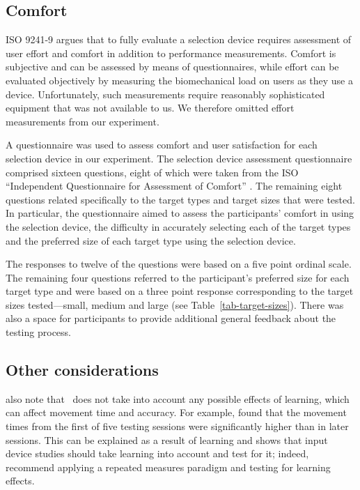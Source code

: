 \documentclass[a4paper]{article}
\begin{document}
\subsection{Comfort}
\label{sec-evaluation-comfort}

ISO 9241-9 argues that to fully evaluate a selection device requires
assessment of user effort and comfort in addition to performance
measurements. Comfort is subjective and can be assessed by means of
questionnaires, while effort can be evaluated objectively by measuring
the biomechanical load on users as they use a device. Unfortunately,
such measurements require reasonably sophisticated equipment
\citep{Doug-SA-1999-CHI} that was not available to us. We therefore
omitted effort measurements from our experiment.

A questionnaire was used to assess comfort and user satisfaction for
each selection device in our experiment. The selection device assessment
questionnaire comprised sixteen questions, eight of which were taken
from the ISO ``Independent Questionnaire for Assessment of Comfort''
\citep{Doug-SA-1999-CHI}. The remaining eight questions related
specifically to the target types and target sizes that were tested. In
particular, the questionnaire aimed to assess the participants' comfort
in using the selection device, the difficulty in accurately selecting each
of the target types and the preferred size of each target type using the
selection device.

The responses to twelve of the questions were based on a five point
ordinal scale. The remaining four questions referred to the
participant's preferred size for each target type and were based on a
three point response corresponding to the target sizes tested---small,
medium and large (see Table~\ref{tab-target-sizes}). There was also a
space for participants to provide additional general feedback about the
testing process.


\subsection{Other considerations}
\label{sec-evaluation-other}

\citet{Doug-SA-1999-CHI} also note that \ISOnine\ does not take into
account any possible effects of learning, which can affect movement time
and accuracy. For example, \citet{Mack-IS-1991} found that the movement
times from the first of five testing sessions were significantly higher
than in later sessions. This can be explained as a result of learning
and shows that input device studies should take learning into account
and test for it; indeed, \citet{Doug-SA-1999-CHI} recommend applying a
repeated measures paradigm and testing for learning effects.
\end{document}
